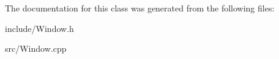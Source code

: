 The documentation for this class was generated from the following files\-:\begin{DoxyCompactItemize}
\item 
include/Window.\-h\item 
src/Window.\-cpp\end{DoxyCompactItemize}
